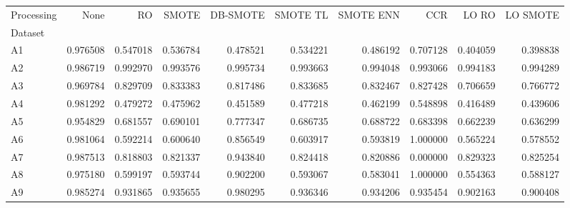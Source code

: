 \begin{tabular}{lrrrrrrrrr}
\toprule
Processing &      None &        RO &     SMOTE &  DB-SMOTE &  SMOTE TL &  SMOTE ENN &       CCR &     LO RO &  LO SMOTE \\
Dataset &           &           &           &           &           &            &           &           &           \\
\midrule
A1      &  0.976508 &  0.547018 &  0.536784 &  0.478521 &  0.534221 &   0.486192 &  0.707128 &  0.404059 &  0.398838 \\
A2      &  0.986719 &  0.992970 &  0.993576 &  0.995734 &  0.993663 &   0.994048 &  0.993066 &  0.994183 &  0.994289 \\
A3      &  0.969784 &  0.829709 &  0.833383 &  0.817486 &  0.833685 &   0.832467 &  0.827428 &  0.706659 &  0.766772 \\
A4      &  0.981292 &  0.479272 &  0.475962 &  0.451589 &  0.477218 &   0.462199 &  0.548898 &  0.416489 &  0.439606 \\
A5      &  0.954829 &  0.681557 &  0.690101 &  0.777347 &  0.686735 &   0.688722 &  0.683398 &  0.662239 &  0.636299 \\
A6      &  0.981064 &  0.592214 &  0.600640 &  0.856549 &  0.603917 &   0.593819 &  1.000000 &  0.565224 &  0.578552 \\
A7      &  0.987513 &  0.818803 &  0.821337 &  0.943840 &  0.824418 &   0.820886 &  0.000000 &  0.829323 &  0.825254 \\
A8      &  0.975180 &  0.599197 &  0.593744 &  0.902200 &  0.593067 &   0.583041 &  1.000000 &  0.554363 &  0.588127 \\
A9      &  0.985274 &  0.931865 &  0.935655 &  0.980295 &  0.936346 &   0.934206 &  0.935454 &  0.902163 &  0.900408 \\
\bottomrule
\end{tabular}
